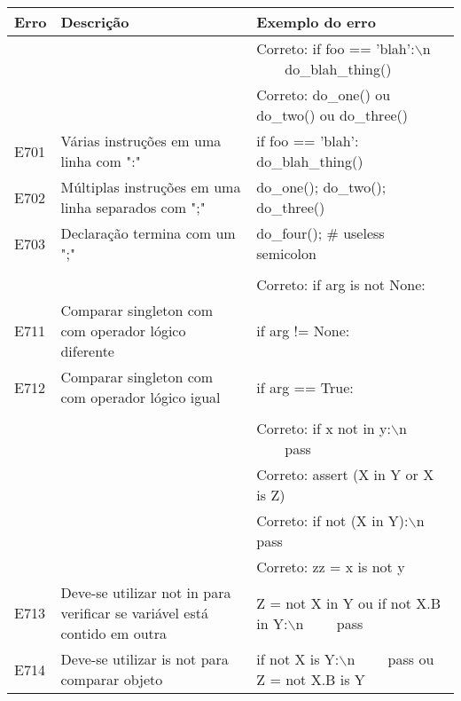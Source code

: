 	\begin{table}
		\scriptsize
		\begin{tabularx}{\linewidth}{ |l|X|X| }
			\hline
			\textbf{Erro}
			& \textbf{Descrição}
			& \textbf{Exemplo do erro} \\
			\hline
			
			& 
			& Correto: if foo == 'blah':$\backslash$n \ \ \ \ do\_blah\_thing() \\
			\hline
			
			& 
			& Correto: do\_one() ou do\_two() ou do\_three() \\
			\hline
			E701 
			& Várias instruções em uma linha com ":" 
			& if foo == 'blah': do\_blah\_thing() \\
			\hline
			E702 
			& Múltiplas instruções em uma linha separados com ";" 
			& do\_one(); do\_two(); do\_three() \\
			\hline
			E703 
			& Declaração termina com um ";" 
			& do\_four();  \# useless semicolon \\
			\hline
			
			& 
			&  \\
			\hline
			
			& 
			& Correto: if arg is not None: \\
			\hline
			E711 
			& Comparar singleton com com operador lógico diferente
			& if arg != None: \\
			\hline
			E712 
			& Comparar singleton com com operador lógico igual
			& if arg == True: \\
			\hline
			
			& 
			&  \\
			\hline
			
			& 
			& Correto: if x not in y:$\backslash$n \ \ \ \ pass \\
			\hline
			
			& 
			& Correto: assert (X in Y or X is Z) \\
			\hline
			
			& 
			& Correto: if not (X in Y):$\backslash$n    pass \\
			\hline
			
			& 
			& Correto: zz = x is not y \\
			\hline
			E713 
			& Deve-se utilizar not in para verificar se variável está contido em outra 
			& Z = not X in Y ou if not X.B in Y:$\backslash$n \ \ \ \ pass \\
			\hline
			E714 
			& Deve-se utilizar is not para comparar objeto 
			& if not X is Y:$\backslash$n \ \ \ \ pass ou Z = not X.B is Y \\
			\hline
			

\end{tabularx}
\end{table}
